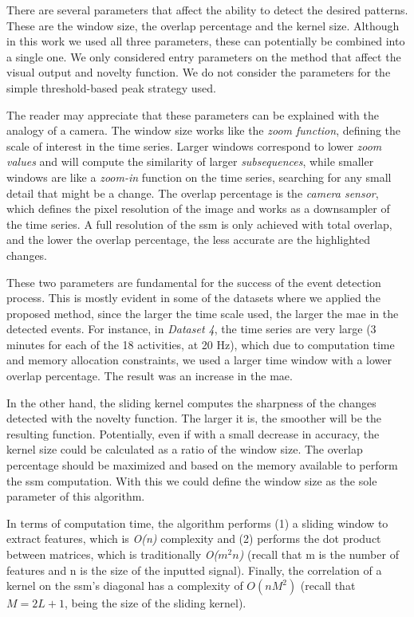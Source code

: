 There are several parameters that affect the ability to detect the desired patterns. These are the window size, the overlap percentage and the kernel size. Although in this work we used all three parameters, these can potentially be combined into a single one. We only considered entry parameters on the method that affect the visual output and novelty function. We do not consider the parameters for the simple threshold-based peak strategy used.
\par
The reader may appreciate that these parameters can be explained with the analogy of a camera. The window size works like the \textit{zoom function}, defining the scale of interest in the time series. Larger windows correspond to lower \textit{zoom values} and will compute the similarity of larger \textit{subsequences}, while smaller windows are like a \textit{zoom-in} function on the time series, searching for any small detail that might be a change. The overlap percentage is the \textit{camera sensor}, which defines the pixel resolution of the image and works as a downsampler of the time series. A full resolution of the \gls{ssm} is only achieved with total overlap, and the lower the overlap percentage, the less accurate are the highlighted changes.
\par
These two parameters are fundamental for the success of the event detection process. This is mostly evident in some of the datasets where we applied the proposed method, since the larger the time scale used, the larger the \gls{mae} in the detected events. For instance, in \textit{Dataset 4}, the time series are very large (3 minutes for each of the 18 activities, at 20 Hz), which due to computation time and memory allocation constraints, we used a larger time window with a lower overlap percentage. The result was an increase in the \gls{mae}.
\par
In the other hand, the sliding kernel computes the sharpness of the changes detected with the novelty function. The larger it is, the smoother will be the resulting function. Potentially, even if with a small decrease in accuracy, the kernel size could be calculated as a ratio of the window size. The overlap percentage should be maximized and based on the memory available to perform the \gls{ssm} computation. With this we could define the window size as the sole parameter of this algorithm.
\par
In terms of computation time, the algorithm performs (1) a sliding window to extract features, which is \textit{O(n)} complexity and (2) performs the dot product between matrices, which is traditionally \textit{O($m^2n$)} (recall that m is the number of features and n is the size of the inputted signal). Finally, the correlation of a kernel on the \gls{ssm}'s diagonal has a complexity of $O(nM^2)$ (recall that $M=2L+1$, being the size of the sliding kernel).

